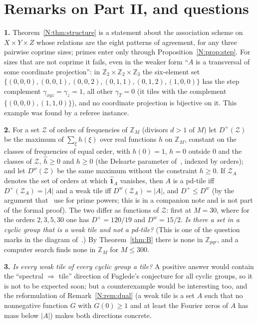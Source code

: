 \documentclass[11pt,a4paper]{amsart}
\theoremstyle{definition}
\theoremstyle{remark}
\newcommand{\Z}{\mathbb{Z}}
\newcommand{\one}{\mathbf{1}}
\begin{document}
\section{Remarks on Part II, and questions}

\textbf{1.} Theorem~\ref{N:thm:structure} is a statement about the association scheme on $X\times Y\times Z$ whose
relations are the eight patterns of agreement, for any three pairwise coprime sizes; primes enter only through
Proposition~\ref{N:prop:step}. For sizes that are not coprime it fails, even in the weaker form ``$A$ is a
transversal of some coordinate projection'': in $\Z_2\times\Z_2\times\Z_3$ the six-element set
$\{(0,0,0),(0,0,1),(0,0,2),(0,1,1),(0,1,2),(1,0,0)\}$ has the step complement $\gamma_{xyz}=\gamma_{z}=1$, all
other $\gamma_T=0$ (it tiles with the complement $\{(0,0,0),(1,1,0)\}$), and no coordinate projection is
bijective on it. This example was found by a referee instance.

\textbf{2.} For a set $\mathcal Z$ of orders of frequencies of $\Z_M$ (divisors $d>1$ of $M$) let $D^+(\mathcal Z)$ be the
maximum of $\sum_\xi h(\xi)$ over real functions $h$ on $\Z_M$, constant on the classes of frequencies of equal
order, with $h(0)=1$, $h=0$ outside $0$ and the classes of $\mathcal Z$, $\hat h\ge 0$ and $h\ge 0$ (the Delsarte
parameter of~\cite{KLMS}, indexed by orders); and let $D^w(\mathcal Z)$ be the same maximum without the constraint
$h\ge 0$. If $\mathcal Z_A$ denotes the set of orders at which $\hat{\one}_A$ vanishes, then $A$ is a pd-tile iff
$D^+(\mathcal Z_A)=|A|$ and a weak tile iff $D^w(\mathcal Z_A)=|A|$, and $D^+\le D^w$ (by the argument that~\cite{KLMS} use for
prime powers; this is in a companion note and is not part of the formal proof). The two differ as functions of
$\mathcal Z$: first at $M=30$, where for the orders $2,3,5,30$ one has $D^+=120/19$ and $D^w=15/2$. \emph{Is there a
set in a cyclic group that is a weak tile and not a pd-tile?} (This is one of the question marks in the diagram
of~\cite{KF}.) By Theorem~\ref{thm:B} there is none in $\Z_{pqr}$, and a computer search finds none in $\Z_M$
for $M\le 300$.

\textbf{3.} \emph{Is every weak tile of every cyclic group a tile?} A positive answer would contain the
``spectral $\Rightarrow$ tile'' direction of Fuglede's conjecture for all cyclic groups, so it is not to be
expected soon; but a counterexample would be interesting too, and the reformulation of Remark~\ref{N:rem:dual}
(a weak tile is a set $A$ such that no nonnegative function $G$ with $G(0)\ge 1$ and at least the Fourier zeros
of $A$ has mass below $|A|$) makes both directions concrete.
\end{document}
